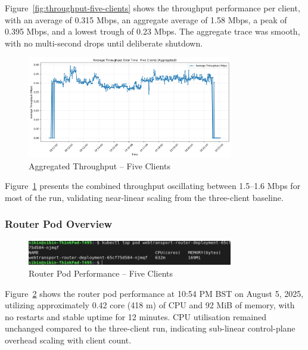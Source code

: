 Figure~\ref{fig:throughput-five-clients} shows the throughput performance per client, with an average of 0.315 Mbps, an aggregate average of 1.58 Mbps, a peak of 0.395 Mbps, and a lowest trough of 0.23 Mbps. The aggregate trace was smooth, with no multi-second drops until deliberate shutdown.

\begin{figure}[H]
\centering
\includegraphics[width=0.8\textwidth]{Evaluation/avg_throughput_aggregated_five-clients.png}
\caption{Aggregated Throughput – Five Clients}
\label{fig:avg-throughput-aggregated-five}
\end{figure}

Figure~\ref{fig:avg-throughput-aggregated-five} presents the combined throughput oscillating between 1.5–1.6 Mbps for most of the run, validating near-linear scaling from the three-client baseline.


\subsubsection{Router Pod Overview}

\begin{figure}[H]
\centering
\includegraphics[width=0.8\textwidth]{Evaluation/five-clients-pod-stats.png}
\caption{Router Pod Performance – Five Clients}
\label{fig:router-pod-five-clients}
\end{figure}

Figure~\ref{fig:router-pod-five-clients} shows the router pod performance at 10:54 PM BST on August 5, 2025, utilizing approximately 0.42 core (418 m) of CPU and 92 MiB of memory, with no restarts and stable uptime for 12 minutes. CPU utilisation remained unchanged compared to the three-client run, indicating sub-linear control-plane overhead scaling with client count.

